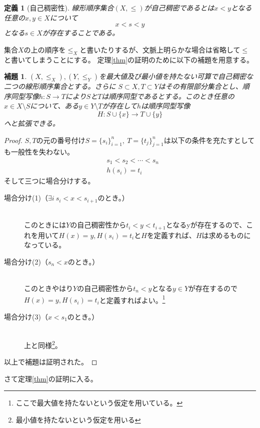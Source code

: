 \documentclass[leqno]{jsarticle}
\newtheorem{lem}[thm]{補題}
\newtheorem{df}[thm]{定義}
\begin{document}
\begin{df}[自己稠密性]
線形順序集合$(X,\le)$が自己稠密であるとは$x<y$となる任意の$x,y\in X$について
\[
x<s<y
\]
となる$s\in X$が存在することである。
\end{df}
集合$X$の上の順序を$\le_X$と書いたりするが、文脈上明らかな場合は省略して$\le$と書いてしまうことにする。
定理\ref{thm}の証明のために以下の補題を用意する。
\begin{lem}\label{lem}
$(X,\le_X), (Y,\le_Y)$を最大値及び最小値を持たない可算で自己稠密な二つの線形順序集合とする。さらに
$S\subset X, T\subset Y$はその有限部分集合とし、順序同型写像$h:S\to T$により$S$と$T$は順序同型であるとする。このとき任意の$x\in X\setminus S$について、ある$y\in Y\setminus T$が存在して$h$は順序同型写像
\[
H:S\cup\{x\}\to T\cup \{y\}
\]
へと拡張できる。
\end{lem}
\begin{proof}
$S,T$の元の番号付け$S=\{s_i\}_{i=1}^n,\ T=\{t_j\}_{j=1}^n$は以下の条件を充たすとしても一般性を失わない。
\begin{align}
&s_1<s_2<\cdots <s_n \\
&h(s_i)=t_i
\end{align}
そして三つに場合分けする。
\begin{description}
\item[場合分け(1)（$\exists i\  s_i<x<s_{i+1}$のとき。）]\mbox{}\\
このときには$Y$の自己稠密性から$t_i<y<t_{i+1}$となるyが存在するので、これを用いて$H(x)=y, H(s_i)=t_i$と$H$を定義すれば、$H$は求めるものになっている。
\item[場合分け(2)（$s_n<x$のとき。）]\mbox{}\\
このときやはり$Y$の自己稠密性から$t_n<y$となる$y\in Y$が存在するので$H(x)=y, H(s_i)=t_i$と定義すればよい。\footnote{ここで最大値を持たないという仮定を用いている。}
\item[場合分け(3)（$x<s_1$のとき。）]\mbox{}\\
上と同様\footnote{最小値を持たないという仮定を用いる}。
\end{description}
以上で補題は証明された。
\end{proof}
さて定理\ref{thm}の証明に入る。
\end{document}
